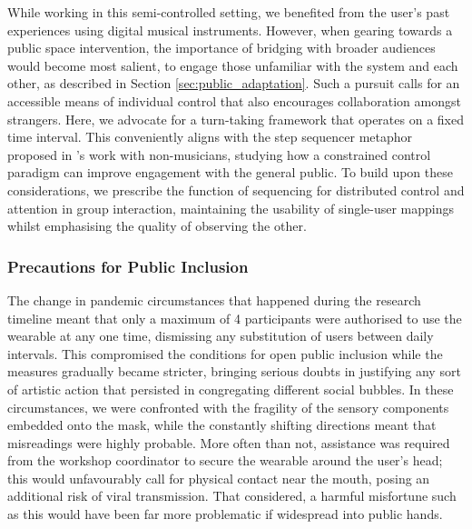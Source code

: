 While working in this semi-controlled setting, we benefited from the user's past experiences using digital musical instruments. However, when gearing towards a public space intervention, the importance of bridging with broader audiences would become most salient, to engage those unfamiliar with the system and each other, as described in Section \ref{sec:public_adaptation}. Such a pursuit calls for an accessible means of individual control that also encourages collaboration amongst strangers. Here, we advocate for a turn-taking framework that operates on a fixed time interval. This conveniently aligns with the step sequencer metaphor proposed in \citeauthor{bengler_designing_2013}'s \citeyear{bengler_designing_2013} work with non-musicians, studying how a constrained control paradigm can improve engagement with the general public. To build upon these considerations, we prescribe the function of sequencing for distributed control and attention in group interaction, maintaining the usability of single-user mappings whilst emphasising the quality of observing the other.

\subsubsection{Precautions for Public Inclusion}

The change in pandemic circumstances that happened during the research timeline meant that only a maximum of 4 participants were authorised to use the wearable at any one time, dismissing any substitution of users between daily intervals. This compromised the conditions for open public inclusion while the measures gradually became stricter, bringing serious doubts in justifying any sort of artistic action that persisted in congregating different social bubbles. In these circumstances, we were confronted with the fragility of the sensory components embedded onto the mask, while the constantly shifting directions meant that misreadings were highly probable. More often than not, assistance was required from the workshop coordinator to secure the wearable around the user's head; this would unfavourably call for physical contact near the mouth, posing an additional risk of viral transmission. That considered, a harmful misfortune such as this would have been far more problematic if widespread into public hands.

